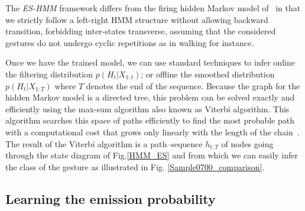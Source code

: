 The \emph{ES-HMM} framework differs from the firing hidden Markov model of~\cite{nowozin2012action} in that we strictly follow a left-right HMM structure without allowing backward transition, forbidding inter-states transverse, assuming that the considered gestures do not undergo cyclic repetitions as in walking for instance.




Once we have the trained model, we can use standard techniques to infer online the filtering distribution $p(H_t | X_{1:t})$; or offline the smoothed distribution $p(H_t | X_{1:T})$ where $T$ denotes the end of the sequence.
Because the graph for the hidden Markov model is a directed tree, this problem can be solved exactly and efficiently using the max-sum algorithm also known as Viterbi algorithm. This algorithm searches this space of paths efficiently to find the most probable path with a computational cost that grows only linearly with the length of the chain~\cite{bishop2006pattern}.
The result of the Viterbi algorithm is a path--sequence $h_{t:T}$ of nodes going through the state diagram of Fig.\ref{HMM_ES} and from which we can easily infer the class of the gesture as illustrated in Fig. \ref{Sample0700_comparison}.



\subsection{Learning the emission probability \emissionprob{}}\label{Problem formation}

